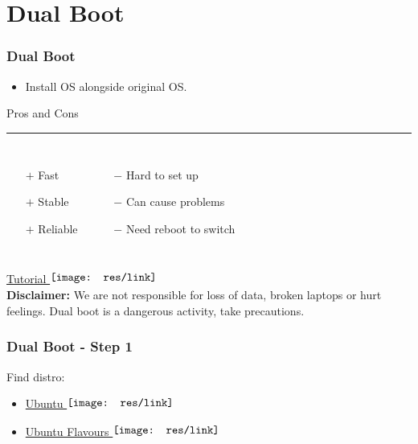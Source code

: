 \section{Dual Boot}
\begin{frame}
	\frametitle{Dual Boot}
    
    \begin{itemize}
    	\item Install OS alongside original OS.
    \end{itemize} \vspace{0.5cm}
    
    Pros and Cons \vspace{0.1cm}
    \hrule 
    \begin{columns}[c]
            \begin{enumerate}
           		\item[$+$] Fast
            	\item[$+$] Stable
                \item[$+$] Reliable
            \end{enumerate}
            \begin{enumerate}
            	\item[$-$] Hard to set up
                \item[$-$] Can cause problems
                \item[$-$] Need reboot to switch
            \end{enumerate}
    \end{columns} \vspace{0.5cm}
    
    \href{http://www.ubuntu.com/download/desktop/install-ubuntu-desktop}{Tutorial $\vcenter{\hbox{\texttt{[image: res/link]}}\vspace{0.1cm}}$} \\
    \vspace{0.5cm}
    \textbf{Disclaimer:} We are not responsible for loss of data, broken laptops or hurt feelings. Dual boot is a dangerous activity, take precautions.
    
\end{frame}

\begin{frame}
	\frametitle{Dual Boot - Step 1}
 
 	Find distro:
    \begin{itemize}
    	\item \href{http://www.ubuntu.com/download}{Ubuntu $\vcenter{\hbox{\texttt{[image: res/link]}}\vspace{0.1cm}}$}
		\item \href{http://www.ubuntu.com/about/about-ubuntu/flavours} {Ubuntu Flavours $\vcenter{\hbox{\texttt{[image: res/link]}}\vspace{0.1cm}}$}
	\end{itemize}
    
\end{frame}

